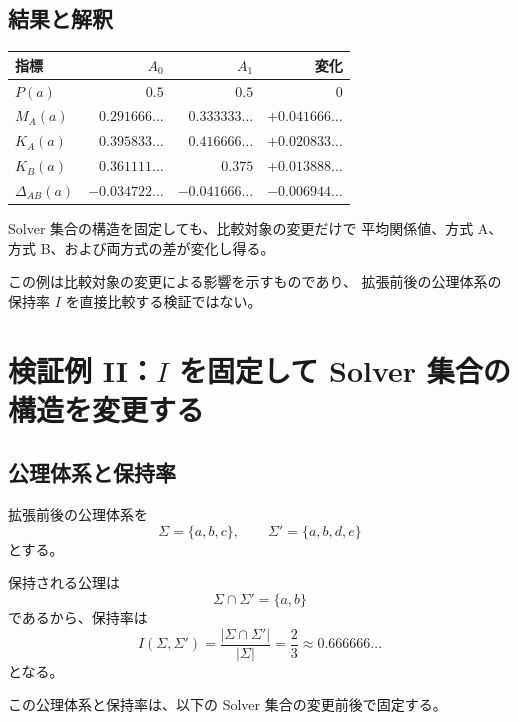 \documentclass[a4paper,11pt]{ltjsarticle}
\begin{document}
\subsection{結果と解釈}

\begin{center}
\begin{tabular}{lrrr}
\toprule
指標 & $A_0$ & $A_1$ & 変化\\
\midrule
$P(a)$ & $0.5$ & $0.5$ & $0$\\
$M_A(a)$ & $0.291666\ldots$ & $0.333333\ldots$ & $+0.041666\ldots$\\
$K_A(a)$ & $0.395833\ldots$ & $0.416666\ldots$ & $+0.020833\ldots$\\
$K_B(a)$ & $0.361111\ldots$ & $0.375$ & $+0.013888\ldots$\\
$\Delta_{AB}(a)$ & $-0.034722\ldots$ & $-0.041666\ldots$ & $-0.006944\ldots$\\
\bottomrule
\end{tabular}
\end{center}

Solver 集合の構造を固定しても、比較対象の変更だけで
平均関係値、方式 A、方式 B、および両方式の差が変化し得る。

この例は比較対象の変更による影響を示すものであり、
拡張前後の公理体系の保持率 $I$ を直接比較する検証ではない。

\section{検証例 II：$I$ を固定して Solver 集合の構造を変更する}

\subsection{公理体系と保持率}

拡張前後の公理体系を
\begin{equation}
  \Sigma=\{a,b,c\},\qquad
  \Sigma'=\{a,b,d,e\}
\end{equation}
とする。

保持される公理は
\begin{equation}
  \Sigma\cap\Sigma'=\{a,b\}
\end{equation}
であるから、保持率は
\begin{equation}
  I(\Sigma,\Sigma')
  =
  \frac{|\Sigma\cap\Sigma'|}{|\Sigma|}
  =\frac23
  \approx0.666666\ldots
\end{equation}
となる。

この公理体系と保持率は、以下の Solver 集合の変更前後で固定する。
\end{document}
